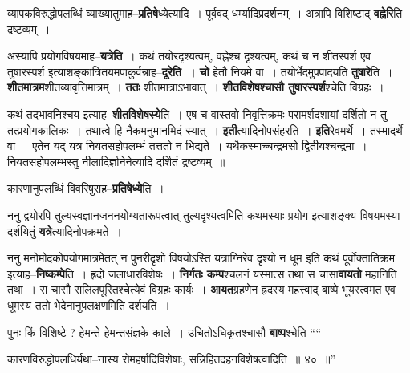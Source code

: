 \documentclass[article,12pt,a4paper]{memoir}
\begin{document}
	  \endgroup
	

	  \pstart व्यापकविरुद्धोपलब्धिं व्याख्यातुमाह--\textbf{प्रतिषे}ध्येत्यादि । पूर्ववद् धर्म्यादिप्रदर्शनम् । अत्रापि विशिष्टाद् \textbf{वह्नेरि}ति द्रष्टव्यम् ।
	\pend
      

	  \pstart अस्यापि प्रयोगविषयमाह--\textbf{यत्रेति} । कथं तयोरदृश्यत्वम्, वह्नेश्च दृश्यत्वम्, कथं च न शीतस्पर्श एव तुषारस्पर्श इत्याशङ्कात्रितयमपाकुर्वन्नाह--\textbf{दूरेति । चो} हेतौ नियमे वा । तयोर्भेदमुपपादयति \textbf{तुषारे}ति । \textbf{शीतमात्रम}शीतव्यावृत्तिमात्रम् । \textbf{ततः} शीतमात्राऽभावात् । \textbf{शीतविशेषश्चासौ तुषारस्पर्श}श्चेति विग्रहः ।
	\pend
      

	  \pstart कथं तदभावनिश्चय इत्याह--\textbf{शीतविशेषस्ये}ति । एष च वास्तवो निवृत्तिक्रमः परामर्शदशायां दर्शितो न तु तत्प्रयोग\leavevmode{}कालिकः । तथात्वे हि नैकमनुमानमिदं स्यात् । \textbf{इती}त्यादिनोपसंहरति । \textbf{इति}रेवमर्थे । तस्मादर्थे वा । एतेन यद् यत्र नियतसहोपलम्भं तत्ततो न भिद्यते । यथैकस्माच्चन्द्रमसो द्वितीयश्चन्द्रमा । नियतसहोपलम्भस्तु नीलादिर्ज्ञानेनेत्यादि दर्शितं द्रष्टव्यम् ॥
	\pend
      

	  \pstart कारणानुपलब्धिं विवरिषुराह--\textbf{प्रतिषेध्ये}ति ।
	\pend
      

	  \pstart ननु द्वयोरपि तुल्यस्वज्ञानजननयोग्यतारूपत्वात् तुल्यदृश्यत्वमिति कथमस्याः प्रयोग इत्याशङ्क्य विषयमस्या दर्शयितुं \textbf{यत्रे}त्यादिनोपक्रमते ।
	\pend
      

	  \pstart ननु मनोमोदकोपयोगमात्रमेतत् न पुनरीदृशो विषयोऽस्ति यत्राग्निरेव दृश्यो न धूम इति कथं पूर्वोक्तातिक्रम इत्याह--\textbf{निष्कम्पे}ति । ह्रदो जलाधारविशेषः । \textbf{निर्गतः कम्प}श्चलनं यस्मात्स तथा स चासा\textbf{वायतो} महानिति तथा । स चासौ सलिलपूरितश्चेत्येवं विग्रहः कार्यः । \textbf{आयत}ग्रहणेन ह्रदस्य महत्त्वाद् बाष्पे भूयस्त्वमत एव धूमस्य ततो भेदेनानुपलक्षणमिति दर्शयति ।
	\pend
      

	  \pstart पुनः किं विशिष्टे ? हेमन्ते हेमन्तसंज्ञके काले । उचितोऽधिकृतश्चासौ \textbf{बाष्प}श्चेति  \leavevmode{} ““
	  
	कारणविरुद्धोपलधिर्यथा--नास्य रोमहर्षादिविशेषाः, सन्निहितदहनविशेषत्वादिति ॥ ४० ॥” 
	  
\end{document}
